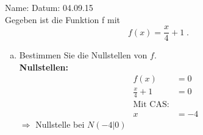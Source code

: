 \documentclass[12pt,fleqn]{article}
\theoremstyle{aufg}
\theoremstyle{bsp}
\begin{document}
 
    \begin{flushleft}
Name: \hspace{12cm} Datum: 04.09.15 \\[2em]Gegeben ist die Funktion f mit\[f(x)=\frac{x}{4} + 1\; . \]\begin{enumerate}[a)] 
\item 
Bestimmen Sie die Nullstellen von $f$. \\ 
{\bf Nullstellen:} 
\begin{align*} 
f(x)&=0 \\ 
\frac{x}{4} + 1&=0 \\ 
\text{Mit CAS:} \\ 
x&=-4\end{align*} 
$\Rightarrow$ Nullstelle bei $N(-4|0)$ \\ 


\end{enumerate}
\end{flushleft}
\end{document}

